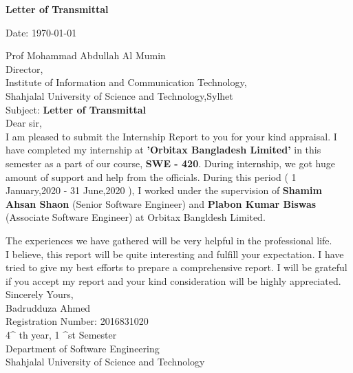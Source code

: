 
    



\vspace{\fill}
\begin{center}
\begin{large}
\textbf{Letter of Transmittal}
\vspace{1cm}
\end{large}
\end{center}
\begin{flushleft}
\begin{flushleft}
Date:
\selectfont
{\today}
\end{flushleft}
\vspace{2pt}

Prof Mohammad Abdullah Al Mumin\\
Director,\\
\vspace{2pt}
Institute of Information and Communication Technology,\\
\vspace{2pt}
Shahjalal University of Science and Technology,Sylhet\\
\vspace{0.5cm}
Subject: \textbf{Letter of Transmittal}\\
\vspace{20pt}
 Dear sir,\\
\vspace{5pt}
I am pleased to submit the Internship Report to you for your kind appraisal. I have
completed my internship at \textbf{'Orbitax Bangladesh Limited'} in this semester as a part of our course, \textbf{SWE - 420}. During
internship, we got huge amount of support and help from the officials. During this period ( 1 January,2020 - 31 June,2020 ), I worked under the supervision of \textbf{Shamim Ahsan Shaon} (Senior Software Engineer) and \textbf{Plabon Kumar Biswas} (Associate Software Engineer) at Orbitax Bangldesh Limited.

 The experiences we
have gathered will be very helpful in the professional life.\\
\vspace{10pt}
I believe, this report will be quite interesting and fulfill your expectation. I have tried to give my best efforts
to prepare a comprehensive report. I will be grateful if you accept my report and your kind consideration will
be highly appreciated.\\ \vspace{10pt}
Sincerely Yours,\\ \vspace{5pt}
Badrudduza Ahmed\\
Registration Number: 2016831020\\\vspace{2pt}
4^ {th} year, 1 ^{st} Semester\\\vspace{2pt}
Department of Software Engineering\\
Shahjalal University of Science and Technology


\end{flushleft}
